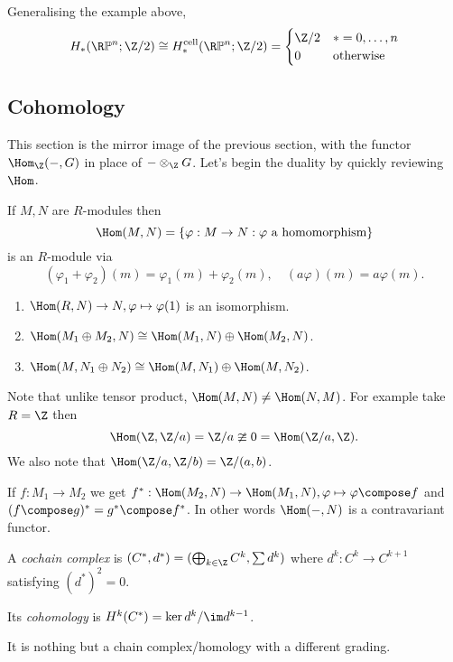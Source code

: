 \documentclass[a4paper]{article}
\renewcommand*{\P}{\mathbb{P}}
\newcommand{\cell}{\mathrm{cell}}
\begin{document}
\begin{eg}
  Generalising the example above,
  \[
    H_*(\R\P^n; \Z/2) \cong H_*^\cell(\R\P^n; \Z/2) =
    \begin{cases}
      \Z/2 & * = 0, \dots, n \\
      0 & \text{otherwise}
    \end{cases}
  \]
\end{eg}

\subsection{Cohomology}

This section is the mirror image of the previous section, with the functor \(\Hom_\Z(-, G)\) in place of \(- \otimes_\Z G\). Let's begin the duality by quickly reviewing \(\Hom\).

If \(M, N\) are \(R\)-modules then
\[
  \Hom(M, N) = \{\varphi: M \to N: \varphi \text{ a homomorphism}\}
\]
is an \(R\)-module via
\[
  (\varphi_1 + \varphi_2)(m) = \varphi_1(m) + \varphi_2(m), \quad (a \varphi)(m) = a \varphi(m).
\]

\begin{proposition}\leavevmode
  \begin{enumerate}
  \item \(\Hom(R, N) \to N, \varphi \mapsto \varphi(1)\) is an isomorphism.
  \item \(\Hom(M_1 \oplus M_2, N) \cong \Hom(M_1, N) \oplus \Hom(M_2, N)\).
  \item \(\Hom(M, N_1 \oplus N_2) \cong \Hom(M, N_1) \oplus \Hom(M, N_2)\).
  \end{enumerate}
\end{proposition}

Note that unlike tensor product, \(\Hom(M, N) \neq \Hom(N, M)\). For example take \(R = \Z\) then
\[
  \Hom(\Z, \Z/a) = \Z/a \ncong 0 = \Hom(\Z/a, \Z).
\]
We also note that \(\Hom(\Z/a, \Z/b) = \Z/(a, b)\).

If \(f: M_1 \to M_2\) we get \(f^*: \Hom(M_2, N) \to \Hom(M_1, N), \varphi \mapsto \varphi \compose f\) and \((f \compose g)^* = g^* \compose f^*\). In other words \(\Hom(-, N)\) is a contravariant functor.

\begin{definition}
  A \emph{cochain complex} is \((C^*, d^*) = (\bigoplus_{k \in \Z} C^k, \sum d^k)\)  where \(d^k: C^k \to C^{k + 1}\) satisfying \((d^*)^2 = 0\).

  Its \emph{cohomology} is \(H^k(C^*) = \ker d^k/\im d^{k - 1}\).
\end{definition}
It is nothing but a chain complex/homology with a different grading.
\end{document}
